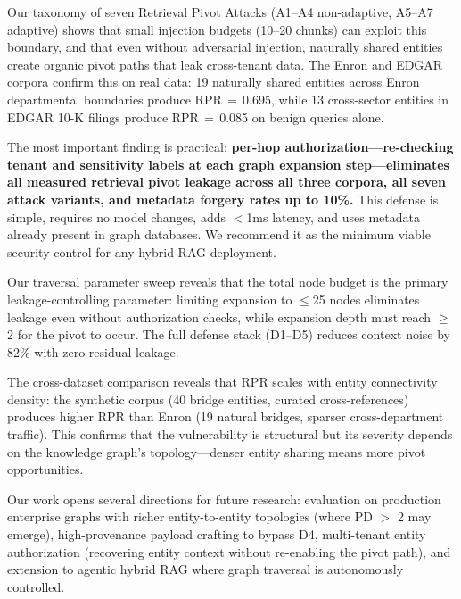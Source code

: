 \documentclass[letterpaper,twocolumn,10pt]{article}
\begin{document}
Our taxonomy of seven Retrieval Pivot Attacks (A1--A4 non-adaptive,
A5--A7 adaptive) shows that small injection budgets (10--20 chunks)
can exploit this boundary, and that even without adversarial
injection, naturally shared entities create organic pivot paths that
leak cross-tenant data. The Enron and EDGAR corpora confirm this on real
data: 19 naturally shared entities across Enron departmental boundaries
produce RPR\,$=$\,0.695, while 13 cross-sector entities in EDGAR 10-K
filings produce RPR\,$=$\,0.085 on benign queries alone.

The most important finding is practical: \textbf{per-hop
authorization---re-checking tenant and sensitivity labels at each
graph expansion step---eliminates all measured retrieval pivot
leakage across all three corpora, all seven attack variants, and metadata
forgery rates up to 10\%.} This defense is simple, requires no model
changes, adds $<$1ms latency, and uses metadata already present in
graph databases. We recommend it as the minimum viable security
control for any hybrid RAG deployment.

Our traversal parameter sweep reveals that the total node budget is
the primary leakage-controlling parameter: limiting expansion to
$\leq$25 nodes eliminates leakage even without authorization checks,
while expansion depth must reach $\geq$2 for the pivot to occur. The
full defense stack (D1--D5) reduces context noise by 82\% with zero
residual leakage.

The cross-dataset comparison reveals that RPR scales with entity
connectivity density: the synthetic corpus (40 bridge entities,
curated cross-references) produces higher RPR than Enron (19 natural
bridges, sparser cross-department traffic). This confirms that the
vulnerability is structural but its severity depends on the knowledge
graph's topology---denser entity sharing means more pivot
opportunities.

Our work opens several directions for future research: evaluation on
production enterprise graphs with richer entity-to-entity topologies
(where PD $>$ 2 may emerge), high-provenance payload crafting to
bypass D4, multi-tenant entity authorization (recovering entity
context without re-enabling the pivot path), and extension to agentic
hybrid RAG where graph traversal is autonomously controlled.




\appendix
\end{document}
